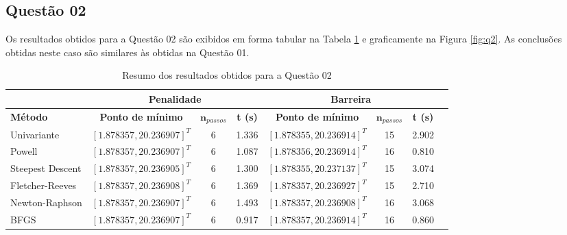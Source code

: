 \documentclass[10pt, a4paper]{article}
\begin{document}
\subsection{Questão 02}

Os resultados obtidos para a Questão 02 são exibidos em forma tabular na Tabela \ref{tab:q2_results} e graficamente na Figura \ref{fig:q2}. As conclusões obtidas neste caso são similares
às obtidas na Questão 01.

\begin{table}[htpb]
  \centering
  \begin{tabular}{|l|c|c|c|c|c|c|c|}
    \multicolumn{1}{c}{} %
    & 
    \multicolumn{3}{c}{\textbf{Penalidade}} \vline
    & 
    \multicolumn{3}{c}{\textbf{Barreira}} \\%
    \hline%
    \textbf{Método}
    &
    \textbf{Ponto de mínimo}
    & 
    $\mathbf{n}_{passos}$
    & 
    \textbf{t (s)}
    &
    \textbf{Ponto de mínimo}
    & 
    $\mathbf{n}_{passos}$
    & 
    \textbf{t (s)}
    \\
    Univariante        & $[1.878357, 20.236907]^T$ &  6 & 1.336 &  $[1.878355, 20.236914]^T$ &  15  & 2.902    \\
    Powell             & $[1.878357, 20.236907]^T$ &  6 & 1.087 &  $[1.878356, 20.236914]^T$ &  16  & 0.810    \\
    Steepest Descent   & $[1.878357, 20.236905]^T$ &  6 & 1.300 &  $[1.878355, 20.237137]^T$ &  15  & 3.074    \\
    Fletcher-Reeves    & $[1.878357, 20.236908]^T$ &  6 & 1.369 &  $[1.878357, 20.236927]^T$ &  15  & 2.710    \\
    Newton-Raphson     & $[1.878357, 20.236907]^T$ &  6 & 1.493 &  $[1.878357, 20.236908]^T$ &  16  & 3.068    \\
    BFGS               & $[1.878357, 20.236907]^T$ &  6 & 0.917 &  $[1.878357, 20.236914]^T$ &  16  & 0.860    \\
    \hline
  \end{tabular}
  \caption{Resumo dos resultados obtidos para a Questão 02}
  \label{tab:q2_results}
\end{table}
\end{document}
